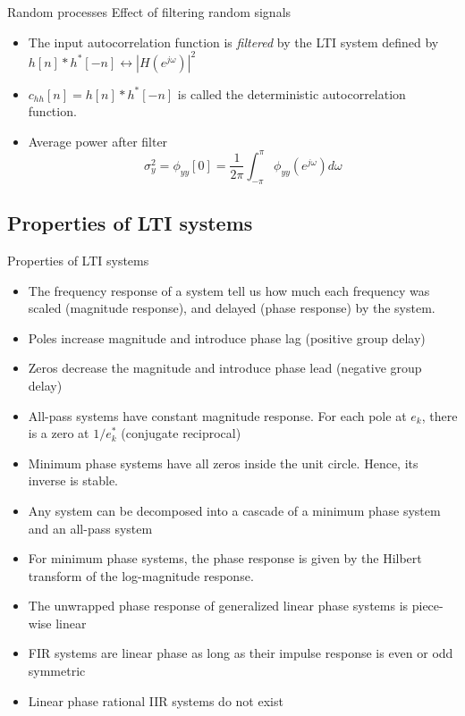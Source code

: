 \documentclass[10pt, aspectratio=169]{beamer}
\begin{document}
%
\begin{frame}{Random processes}
Effect of filtering random signals
\begin{center}
	\resizebox{0.5\linewidth}{!}{}
\end{center}

\begin{itemize}
	\item The input autocorrelation function is \textit{filtered} by the LTI system defined by $h[n]\ast h^*[-n] \leftrightarrow |H(e^{j\omega})|^2$
	\item $c_{hh}[n] = h[n]\ast h^*[-n]$ is called the deterministic autocorrelation function.
	\item Average power after filter
	\begin{equation*}
		\sigma^2_y = \phi_{yy}[0] = \frac{1}{2\pi}\int_{-\pi}^{\pi} \phi_{yy}(e^{j\omega}) d\omega
	\end{equation*}
\end{itemize}
\end{frame}

%
\subsection{Properties of LTI systems}
\begin{frame}{Properties of LTI systems}
\begin{itemize}
	\item The frequency response of a system tell us how much each frequency was scaled (magnitude response), and delayed (phase response) by the system.
	\item Poles increase magnitude and introduce phase lag (positive group delay)
	\item Zeros decrease the magnitude and introduce phase lead (negative group delay)
	\item All-pass systems have constant magnitude response. For each pole at $e_k$, there is  a zero at $1/e^*_k$ (conjugate reciprocal)
	\item Minimum phase systems have all zeros inside the unit circle. Hence, its inverse is stable.
	\item Any system can be decomposed into a cascade of a minimum phase system and an all-pass system
	\item For minimum phase systems, the phase response is given by the Hilbert transform of the log-magnitude response. 
	\item The unwrapped phase response of generalized linear phase systems is piece-wise linear
	\item FIR systems are linear phase as long as their impulse response is even or odd symmetric
	\item Linear phase rational IIR systems do not exist
\end{itemize}
\end{frame}
\end{document}
